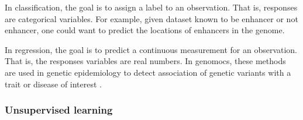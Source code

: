 In classification, the goal is to assign a label to an observation. That is, responses are categorical variables.
For example, given dataset known to be
enhancer or not enhancer, one could want to predict the locations of enhancers in the genome.

In regression, the goal is to predict a continuous measurement for an observation. That is, the responses variables are real numbers. In genomocs, these methods are  used in genetic epidemiology to detect association of genetic variants with a trait or disease of interest \cite{dasgupta2011brief}.




\subsubsection{Unsupervised learning}





